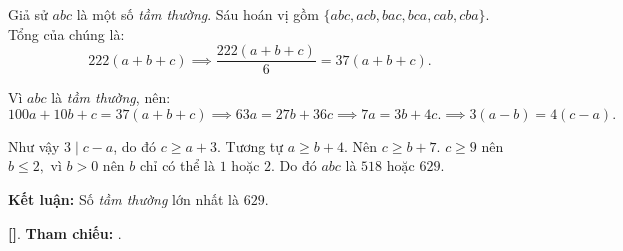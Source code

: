 \documentclass[../2015-n-s.tex]{subfiles}
\begin{document}
\begin{soln}

	Giả sử \( abc \) là một số \textit{tầm thường}. Sáu hoán vị gồm \( \{abc, acb, bac, bca, cab, cba\} \). Tổng của chúng là:
	\[
		222(a + b + c) \implies \frac{222(a + b + c)}{6} = 37(a + b + c).
	\]
	
	Vì \( abc \) là \textit{tầm thường}, nên:
	\[
		100a + 10b + c = 37(a + b + c) \implies 63a = 27b + 36c \implies 7a = 3b + 4c.
		\implies 3(a-b) = 4(c-a).
	\]

	Như vậy $3 \mid c-a$, do đó $c \ge a + 3.$ Tương tự $a \ge b + 4$. Nên $c \ge b+7.$
	$c \ge 9$ nên $b \le 2,$ vì $b > 0$ nên $b$ chỉ có thể là $1$ hoặc $2.$ Do đó $abc$ là $518$ hoặc $629.$

	\textbf{Kết luận:} Số \textit{tầm thường} lớn nhất là \( \boxed{629} \).

	\vspace{1em}
	\textbf{[]}.
	\textbf{Tham chiếu:}  .
\end{soln}

\end{document}
